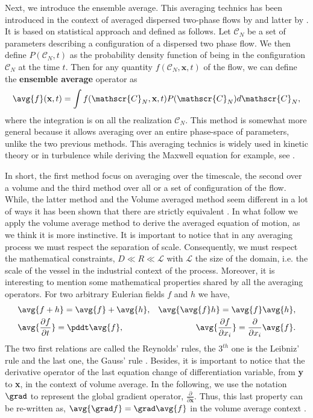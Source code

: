 Next, we introduce the ensemble average. 
This averaging technics has been introduced in the context of averaged dispersed 
two-phase flows by \citet{batchelor1972sedimentation,hinch1977averaged} and latter by \citet{zhang1994averaged}.
It is based on statistical approach and defined as follows. 
Let $\mathscr{C}_N$ be a set of parameters describing a configuration of a dispersed two phase flow. 
We then define $P(\mathscr{C}_N,t)$ as the probability density function of being in the configuration $\mathscr{C}_N$ at the time $t$. 
Then for any quantity $f(\mathscr{C}_N,\textbf{x},t)$ of the flow, we can define the \textbf{ensemble average} operator as
\begin{equation}
    \label{eq:enselblea}
    \avg{f}(\textbf{x},t) 
    = \int f(\mathscr{C}_N,\textbf{x},t) P(\mathscr{C}_N)d\mathscr{C}_N,
\end{equation}
where the integration is on all the realization $\mathscr{C}_N$. 
This method is somewhat more general because it allows averaging over an entire 
phase-space of parameters, unlike the two previous methods. 
This averaging technics is widely used in kinetic theory or in turbulence while deriving the Maxwell equation  for example, see \citet[Chapter 7]{rao2008introduction}.  

In short, the first method focus on averaging over the timescale, the second over a volume and the third method over all or a set of configuration of the flow.
While, the latter method and the Volume averaged method seem different in a lot of ways it has been shown that there are strictly equivalent \citet{jackson1997locally,zhang1994ensemble}.
In what follow we apply the volume average method to derive the averaged equation of motion, as we think it is more instinctive.
It is important to notice that in any averaging process we must respect the separation of 
scale. 
Consequently, we must respect the mathematical constraints, $D\ll R\ll \mathcal{L}$ with $\mathcal{L}$ the size of the domain, i.e. the scale of the vessel in the industrial context of the process. 
Moreover, it is interesting to mention some mathematical properties shared by all the averaging operators. 
For two arbitrary Eulerian fields $f$ and $h$ we have,
\begin{align}
    &\avg{f+h} = \avg{f}+\avg{h}, 
    &\avg{\avg{f}h} = \avg{f}\avg{h}, \nonumber \\
    &\avg{\frac{\partial f}{\partial t}} 
    = \pddt\avg{f}, 
    &\avg{\frac{\partial f}{\partial x_i}}
    = \frac{\partial}{\partial x_i}\avg{f}. 
    \label{eq:avg_properties}
\end{align}
The two first relations are called the Reynolds' rules, the $3^{th}$ one is the Leibniz' 
rule and the last one, the Gauss' rule \citep{drew1983mathematical}.
Besides, it is important to notice that the derivative operator of the last equation change of differentiation variable, from \textbf{y} to \textbf{x}, in the context of volume average.
In the following, we use the notation $\grad$ to represent the global gradient operator, $\frac{\partial}{\partial \textbf{x}}$.
Thus, this last property can be re-written as, $\avg{\grad f}= \grad \avg{f}$ in the volume average context \citep{jackson1997locally}.

